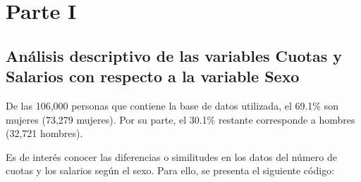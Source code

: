 \documentclass[
]{article}
\begin{document}
\newpage

\hypertarget{parte-i}{%
\section{Parte I}\label{parte-i}}

\hypertarget{anuxe1lisis-descriptivo-de-las-variables-cuotas-y-salarios-con-respecto-a-la-variable-sexo}{%
\subsection{Análisis descriptivo de las variables Cuotas y Salarios con
respecto a la variable
Sexo}\label{anuxe1lisis-descriptivo-de-las-variables-cuotas-y-salarios-con-respecto-a-la-variable-sexo}}

De las 106,000 personas que contiene la base de datos utilizada, el
69.1\% son mujeres (73,279 mujeres). Por su parte, el 30.1\% restante
corresponde a hombres (32,721 hombres).

Es de interés conocer las diferencias o similitudes en los datos del
número de cuotas y los salarios según el sexo. Para ello, se presenta el
siguiente código:
\end{document}
